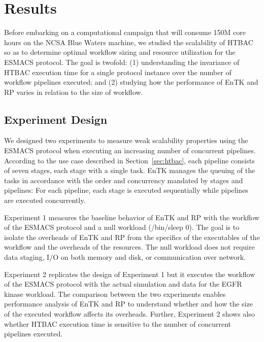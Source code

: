 \documentclass{bmcart}
\begin{document}
\section*{Results}\label{sec:3}

Before embarking on a computational campaign that will consume 150M core
hours on the NCSA Blue Waters machine, we studied the scalability of HTBAC so
as to determine optimal workflow sizing and resource utilization for the
ESMACS protocol. The goal is twofold: (1) understanding the invariance of HTBAC execution time for a single protocol instance over the number of workflow pipelines executed; and (2) studying how the performance of EnTK and RP varies 
in relation to the size of workflow.

\subsection*{Experiment Design}\label{ssec:exp_design}

We designed two experiments to measure weak scalability properties using the 
ESMACS protocol when executing an increasing number of concurrent pipelines. According to the use case described in Section~\ref{sec:htbac}, each pipeline consists of seven stages, each stage with a single task. EnTK manages the queuing of the tasks in accordance with the order and concurrency mandated by stages and
pipelines: For each pipeline, each stage is executed sequentially while
pipelines are executed concurrently.

Experiment 1 measures the baseline behavior of EnTK and RP with the workflow
of the ESMACS protocol and a null workload (\textmd{/bin/sleep 0}). The goal
is to isolate the overheads of EnTK and RP from the specifics of the
executables of the workflow and the overheads of the resources. The null
workload does not require data staging, I/O on both memory and disk, or
communication over network.

Experiment 2 replicates the design of Experiment 1 but it executes the
workflow of the ESMACS protocol with the actual simulation and data for the
EGFR kinase workload. The comparison between the two experiments enables
performance analysis of EnTK and RP to understand whether and how the size of
the executed workflow affects its overheads. Further, Experiment 2 shows also
whether HTBAC execution time is sensitive to the number of concurrent
pipelines executed.
\end{document}
